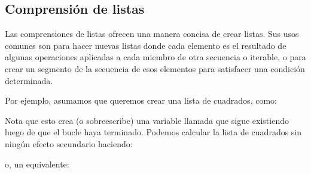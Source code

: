 \documentclass[a5paper,10pt,spanish]{sphinxmanual}
\begin{document}
\subsection{Comprensión de listas}
\label{\detokenize{tutorial/datastructures:list-comprehensions}}\label{\detokenize{tutorial/datastructures:tut-listcomps}}
\sphinxAtStartPar
Las comprensiones de listas ofrecen una manera concisa de crear listas. Sus usos comunes son para hacer nuevas listas donde cada elemento es el resultado de algunas operaciones aplicadas a cada miembro de otra secuencia o iterable, o para crear un segmento de la secuencia de esos elementos para satisfacer una condición determinada.

\sphinxAtStartPar
Por ejemplo, asumamos que queremos crear una lista de cuadrados, como:

\begin{sphinxVerbatim}[commandchars=\\\{\}]
  \PYG{p}{[}\PYG{p}{]}
   
    
\end{sphinxVerbatim}

\sphinxAtStartPar
Nota que esto crea (o sobreescribe) una variable llamada  que sigue existiendo luego de que el bucle haya terminado. Podemos calcular la lista de cuadrados sin ningún efecto secundario haciendo:

\begin{sphinxVerbatim}[commandchars=\\\{\}]
     
\end{sphinxVerbatim}

\sphinxAtStartPar
o, un equivalente:

\begin{sphinxVerbatim}[commandchars=\\\{\}]
  \PYG{p}{[}    \PYG{p}{]}
\end{sphinxVerbatim}
\end{document}
